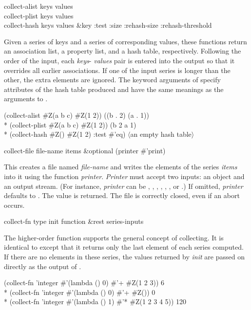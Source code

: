 \begin{defun}[Function]
collect-alist keys values \\
collect-plist keys values \\
collect-hash keys values &key :test :size :rehash-size :rehash-threshold

\noindent Given a series of keys and a series of corresponding values, these
functions return an association list, a property list, and a hash table,
respectively.  Following the order of the input, each {\it keys}-{\it
values} pair is entered into the output so that it overrides all
earlier associations.  If one of the input series is longer than the other,
the extra elements are ignored.  The keyword arguments of 
 specify attributes of the hash table produced and have the
same meanings as the arguments to .
\begin{lisp}
(collect-alist \#Z(a b c) \#Z(1 2)) {\EV} ((b . 2) (a . 1)) \\*
(collect-plist \#Z(a b c) \#Z(1 2)) {\EV} (b 2 a 1) \\*
(collect-hash \#Z() \#Z(1 2) :test \#'eq) {\EV} {\rm $\langle$an empty hash table$\rangle$}
\end{lisp}
\end{defun}

\begin{defun}[Function]
collect-file file-name items &optional (printer \#'print)

This creates a file named {\it file-name} and writes the
elements of the series {\it items} into it using the function {\it
printer}.  {\it Printer} must accept two inputs: an object
and an output stream.  (For instance, {\it printer} can be ,
, , , ,
, or .)
If omitted, {\it printer} defaults to .  The value  is
returned.  The file is correctly closed, even if an abort occurs.
\end{defun}


\begin{defun}[Function]
collect-fn type init function &rest series-inputs

The higher-order function  supports the general concept of
collecting.  It is identical to  except that it
returns only the last element of each series computed.  If there are no elements
in these series, the values returned by {\it init} are passed on directly
as the output of .
\begin{lisp}
(collect-fn 'integer \#'(lambda () 0) \#'+ \#Z(1 2 3)) {\EV} 6 \\*
(collect-fn 'integer \#'(lambda () 0) \#'+ \#Z()) {\EV} 0 \\*
(collect-fn 'integer \#'(lambda () 1) \#'* \#Z(1 2 3 4 5)) {\EV} 120
\end{lisp}
\end{defun}

